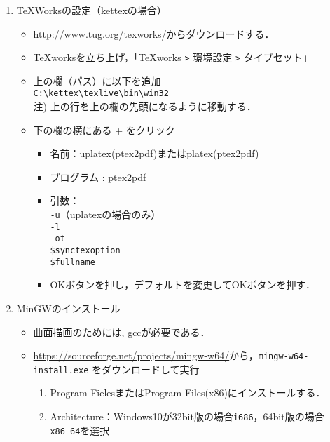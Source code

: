 \documentclass{ujarticle}
\begin{document}
\begin{enumerate}[\bf\large 1.]
\begin{enumerate}[(1)]
\item TeXWorksの設定（kettexの場合）
  \begin{itemize}
  \item \url{http://www.tug.org/texworks/}からダウンロードする．
   \item TeXworksを立ち上げ，「TeXworks \verb|>| 環境設定 \verb|>| タイプセット」
  \item 上の欄（パス）に以下を追加\\
  \hspace*{5mm}\verb|C:\kettex\texlive\bin\win32|\\
  \hspace*{10mm}注) 上の行を上の欄の先頭になるように移動する．
  \item 下の欄の横にある + をクリック
    \begin{itemize}
    \item 名前：uplatex(ptex2pdf)またはplatex(ptex2pdf)
    \item プログラム : ptex2pdf
    \item 引数：\\
    \hspace*{10mm} \verb|-u|（uplatexの場合のみ）\\
    \hspace*{10mm} \verb|-l|\\
    \hspace*{10mm} \verb|-ot|\\
    \hspace*{10mm}  \verb|$synctexoption|\\
    \hspace*{10mm}  \verb|$fullname|
    \item[]OKボタンを押し，デフォルトを変更してOKボタンを押す．
    \end{itemize}
  \end{itemize}

\item MinGWのインストール
  \begin{itemize}
    \item 曲面描画のためには, gccが必要である．
    \item \url{https://sourceforge.net/projects/mingw-w64/}から，\verb|mingw-w64-install.exe|
    をダウンロードして実行
  \begin{enumerate}[(1)]
  \item Program FielesまたはProgram Files(x86)にインストールする．
  \item Architecture：Windows10が32bit版の場合\verb|i686|，64bit版の場合\verb|x86_64|を選択
\end{enumerate}

 \end{itemize}

\end{enumerate}

\end{enumerate}
\end{document}
